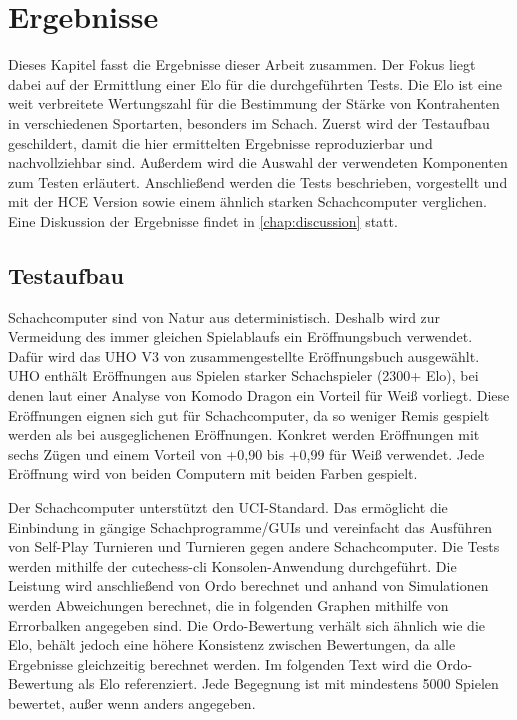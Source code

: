 \chapter{Ergebnisse}
\label{chap:Ergebnisse}

Dieses Kapitel fasst die Ergebnisse dieser Arbeit zusammen. Der Fokus liegt dabei auf der Ermittlung einer Elo für die durchgeführten Tests. Die Elo ist eine weit verbreitete Wertungszahl für die Bestimmung der Stärke von Kontrahenten in verschiedenen Sportarten, besonders im Schach. Zuerst wird der Testaufbau geschildert, damit die hier ermittelten Ergebnisse reproduzierbar und nachvollziehbar sind. Außerdem wird die Auswahl der verwendeten Komponenten zum Testen erläutert. Anschließend werden die Tests beschrieben, vorgestellt und mit der \ac{HCE} Version sowie einem ähnlich starken Schachcomputer verglichen. Eine Diskussion der Ergebnisse findet in \autoref{chap:discussion} statt.

\section{Testaufbau}

Schachcomputer sind von Natur aus deterministisch. Deshalb wird zur Vermeidung des immer gleichen Spielablaufs ein Eröffnungsbuch verwendet. Dafür wird das \ac{UHO} V3 von \citeauthor{Pohl2021} \cite{Pohl2021} zusammengestellte Eröffnungsbuch ausgewählt. \ac{UHO} enthält Eröffnungen aus Spielen starker Schachspieler (2300+ Elo), bei denen laut einer Analyse von Komodo Dragon \cite{KomodoDragon} ein Vorteil für Weiß vorliegt. Diese Eröffnungen eignen sich gut für Schachcomputer, da so weniger Remis gespielt werden als bei ausgeglichenen Eröffnungen. Konkret werden Eröffnungen mit sechs Zügen und einem Vorteil von +0,90 bis +0,99 für Weiß verwendet. Jede Eröffnung wird von beiden Computern mit beiden Farben gespielt.

Der Schachcomputer unterstützt den \ac{UCI}-Standard. Das ermöglicht die Einbindung in gängige Schachprogramme/GUIs und vereinfacht das Ausführen von Self-Play Turnieren und Turnieren gegen andere Schachcomputer. Die Tests werden mithilfe der cutechess-cli \cite{CutechessRepo} Konsolen-Anwendung durchgeführt. Die Leistung wird anschließend von Ordo \cite{OrdoRepo} berechnet und anhand von Simulationen werden Abweichungen berechnet, die in folgenden Graphen mithilfe von Errorbalken angegeben sind. Die Ordo-Bewertung verhält sich ähnlich wie die Elo, behält jedoch eine höhere Konsistenz zwischen Bewertungen, da alle Ergebnisse gleichzeitig berechnet werden. Im folgenden Text wird die Ordo-Bewertung als Elo referenziert. Jede Begegnung ist mit mindestens 5000 Spielen bewertet, außer wenn anders angegeben.

